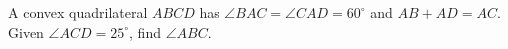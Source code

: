 A convex quadrilateral $ABCD$ has $\angle BAC=\angle CAD=60^\circ$ and $AB+AD=AC$. Given $\angle ACD=25^\circ$, find $\angle ABC$.
